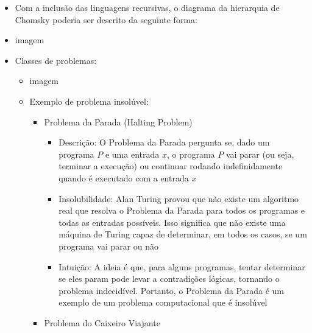 \documentclass[12pt]{article}
\begin{document}
\begin{itemize}
\begin{itemize}
        reconhecida por uma MT
        \item Dada um LER, existe uma MT que para para qualquer entrada desta 
        linguagem? Não!
        \item Daí definiu-se uma subclasse para LERs, a classe das linguagens 
        recursivas:
        \begin{itemize}
            \item Uma lingugem L é dita recursiva se existe uma MT que reconhece 
            todas as palavras de L e para
        \end{itemize}
    \end{itemize}
    \item Com a inclusão das linguagens recursivas, o diagrama da hierarquia de 
    Chomsky poderia ser descrito da seguinte forma:
    \item[] imagem
    \item Classes de problemas:
    \begin{itemize}
        \item[] imagem
        \item Exemplo de problema insolúvel:
        \begin{itemize}
            \item Problema da Parada (Halting Problem)
            \begin{itemize}
                \item Descrição: O Problema da Parada pergunta se, dado um programa 
                $P$ e uma entrada $x$, o programa $P$ vai parar (ou seja, terminar 
                a execução) ou continuar rodando indefinidamente quando é executado 
                com a entrada $x$
                \item Insolubilidade: Alan Turing provou que não existe um algoritmo 
                real que resolva o Problema da Parada para todos os programas e 
                todas as entradas possíveis. Isso significa que não existe uma 
                máquina de Turing capaz de determinar, em todos os casos, se um 
                programa vai parar ou não
                \item Intuição: A ideia é que, para alguns programas, tentar 
                determinar se eles param pode levar a contradições lógicas, tornando 
                o problema indecidível. Portanto, o Problema da Parada é um exemplo 
                de um problema computacional que é insolúvel
            \end{itemize}
            \item Problema do Caixeiro Viajante

\end{itemize}
\end{itemize}
\end{itemize}
\end{document}
